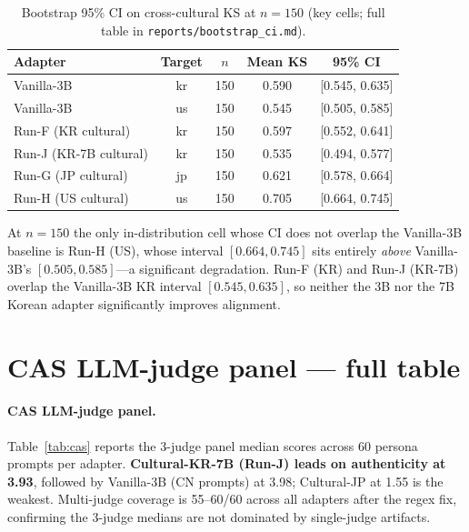 \documentclass{article}
\begin{document}
\begin{table}[h]
\centering
\small
\caption{Bootstrap 95\% CI on cross-cultural KS at $n=150$ (key cells; full table in \texttt{reports/bootstrap\_ci.md}).}
\begin{tabular}{lcccc}
\toprule
Adapter & Target & $n$ & Mean KS & 95\% CI \\
\midrule
Vanilla-3B & kr & 150 & 0.590 & [0.545, 0.635] \\
Vanilla-3B & us & 150 & 0.545 & [0.505, 0.585] \\
Run-F (KR cultural) & kr & 150 & 0.597 & [0.552, 0.641] \\
Run-J (KR-7B cultural) & kr & 150 & 0.535 & [0.494, 0.577] \\
Run-G (JP cultural) & jp & 150 & 0.621 & [0.578, 0.664] \\
Run-H (US cultural) & us & 150 & 0.705 & [0.664, 0.745] \\
\bottomrule
\end{tabular}
\end{table}

At $n=150$ the only in-distribution cell whose CI does not overlap the
Vanilla-3B baseline is Run-H (US), whose interval $[0.664, 0.745]$ sits
entirely \emph{above} Vanilla-3B's $[0.505, 0.585]$---a significant
degradation. Run-F (KR) and Run-J (KR-7B) overlap the Vanilla-3B KR
interval $[0.545, 0.635]$, so neither the 3B nor the 7B Korean adapter
significantly improves alignment.


\section{CAS LLM-judge panel — full table}
\label{app:cas}

\paragraph{CAS LLM-judge panel.}
Table~\ref{tab:cas} reports the 3-judge panel median scores across 60 persona prompts per adapter. \textbf{Cultural-KR-7B (Run-J) leads on authenticity at 3.93}, followed by Vanilla-3B (CN prompts) at 3.98; Cultural-JP at 1.55 is the weakest. Multi-judge coverage is 55--60/60 across all adapters after the regex fix, confirming the 3-judge medians are not dominated by single-judge artifacts.
\end{document}
